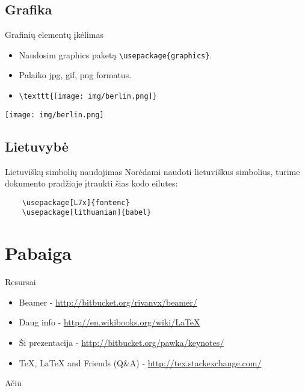\documentclass[11pt,a4paper]{beamer}
\begin{document}
\subsection{Grafika}
\begin{frame}[fragile]{Grafinių elementų įkėlimas}
    \begin{itemize}
        \item Naudosim graphics paketą \verb|\usepackage{graphics}|.
        \item Palaiko jpg, gif, png formatus.
        \item \verb|\texttt{[image: img/berlin.png]}|
    \end{itemize}
    \begin{center}
    \texttt{[image: img/berlin.png]} 
    \end{center}
\end{frame}

\subsection{Lietuvybė}
\begin{frame}[fragile]{Lietuviškų simbolių naudojimas}
    Norėdami naudoti lietuviškus simbolius, turime dokumento pradžioje įtraukti šias kodo eilutes:
    \begin{verbatim}
    \usepackage[L7x]{fontenc}
    \usepackage[lithuanian]{babel} 
    \end{verbatim}
\end{frame}

\section{Pabaiga}
\begin{frame}{Resursai}
    \begin{itemize}
        \item Beamer - \href{http://bitbucket.org/rivanvx/beamer/}{http://bitbucket.org/rivanvx/beamer/} 
        \item Daug info - \href{http://en.wikibooks.org/wiki/LaTeX}{http://en.wikibooks.org/wiki/LaTeX}
        \item Ši prezentacija - \href{http://bitbucket.org/pawka/keynotes/}{http://bitbucket.org/pawka/keynotes/}
        \item TeX, LaTeX and Friends (Q\&A) - \href{http://tex.stackexchange.com/}{http://tex.stackexchange.com/} 
    \end{itemize}
\end{frame}


\begin{frame}
	\begin{center}
	Ačiū
	\end{center}
\end{frame}
\end{document}
